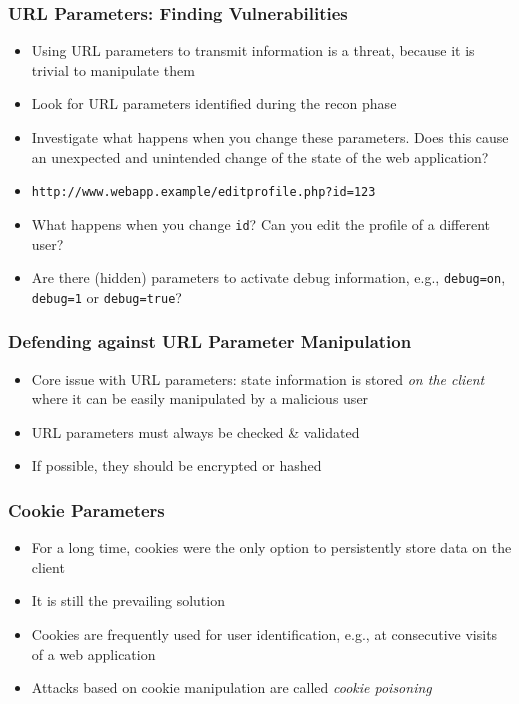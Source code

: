 \begin{frame}[fragile]
    \frametitle{URL Parameters: Finding Vulnerabilities}
    \begin{itemize}
        \item Using URL parameters to transmit information is a threat, because it is trivial to manipulate them
        \item Look for URL parameters identified during the recon phase
        \item Investigate what happens when you change these parameters. Does this cause an unexpected and unintended change of the state of the web application?
        \item \verb|http://www.webapp.example/editprofile.php?id=123|
        \item What happens when you change \verb|id|? Can you edit the profile of a different user?
        \item Are there (hidden) parameters to activate debug information, e.g., \verb|debug=on|, \verb|debug=1| or \verb|debug=true|?
    \end{itemize}
\end{frame}

\begin{frame}
    \frametitle{Defending against URL Parameter Manipulation}
    \begin{itemize}
        \item Core issue with URL parameters: state information is stored \textit{on the client} where it can be easily manipulated by a malicious user
        \item URL parameters must always be checked \& validated
        \item If possible, they should be encrypted or hashed
    \end{itemize}
\end{frame}

\begin{frame}
    \frametitle{Cookie Parameters}
    \begin{itemize}
        \item For a long time, cookies were the only option to persistently store data on the client
        \item It is still the prevailing solution
        \item Cookies are frequently used for user identification, e.g., at consecutive visits of a web application
        \item Attacks based on cookie manipulation are called \textit{cookie poisoning}  
    \end{itemize}
\end{frame}

